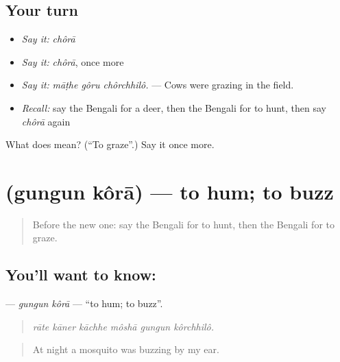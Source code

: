 \subsection*{Your turn}
\begin{itemize}
\raggedright
  \item \emph{Say it:} \emph{chôrā}
  \item \emph{Say it:} \emph{chôrā}, once more
  \item \emph{Say it:} \emph{māṭhe gôru chôrchhilô.} — Cows were grazing in the field.
  \item \emph{Recall:} say the Bengali for a deer, then the Bengali for to hunt, then say \emph{chôrā} again
\end{itemize}

\begin{tcolorbox}[breakable,colback=teal!4,colframe=teal!35!black,title={Before you move on}]
What does  mean? (\textquotedblleft{}To graze\textquotedblright{}.) Say it once more.
\end{tcolorbox}
\section[\texorpdfstring{\bn{গুনগুন} \bn{করা} (gungun kôrā)}{গুনগুন করা (gungun kôrā)}]{  (gungun kôrā) — to hum; to buzz}

\label{lesson:BN-C437-gungun-kora}



\begin{quote}
Before the new one: say the Bengali for to hunt, then the Bengali for to graze.
\end{quote}

\subsection*{You'll want to know:  }
\textbf{ } — \emph{gungun kôrā} — \textquotedblleft{}to hum; to buzz\textquotedblright{}.

\begin{quote}
     
\end{quote}

\begin{quote}
\emph{rāte kāner kāchhe môshā gungun kôrchhilô.}
\end{quote}

\begin{quote}
At night a mosquito was buzzing by my ear.
\end{quote}

